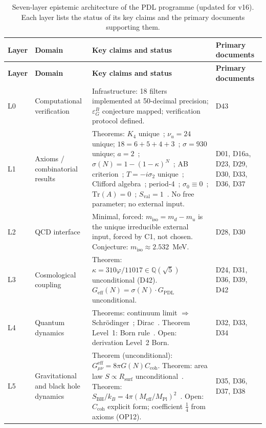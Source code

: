 \documentclass[11pt,a4paper]{article}
\theoremstyle{plain}
\theoremstyle{definition}
\theoremstyle{remark}
\newcommand{\Geff}{G_{\mathrm{eff}}}
\newcommand{\GPDL}{G_{\mathrm{PDL}}}
\newcommand{\Rsurf}{R_{\mathrm{surf}}}
\newcommand{\sigmaN}{\sigma(N)}
\newcommand{\SBH}{S_{\mathrm{BH}}}
\newcommand{\Meff}{M_{\mathrm{eff}}}
\newcommand{\MPl}{M_{\mathrm{Pl}}}
\newcommand{\epsGeomB}{\varepsilon_G^B}
\begin{document}
\begin{longtable}{L{0.6cm}L{3.0cm}L{5.5cm}L{4.0cm}}
\caption{Seven-layer epistemic architecture of the PDL programme (updated for v16). Each layer lists the status of its key claims and the primary documents supporting them.}
\label{tab:epistemic}\\
\toprule
\textbf{Layer} & \textbf{Domain} & \textbf{Key claims and status} & \textbf{Primary documents}\\
\midrule
\endfirsthead
\toprule
\textbf{Layer} & \textbf{Domain} & \textbf{Key claims and status} & \textbf{Primary documents}\\
\midrule
\endhead
\bottomrule
\endfoot
L0 & Computational verification & \textcolor{proofblue}{Infrastructure}: 18 filters implemented at 50-decimal precision; $\epsGeomB$ conjecture mapped; verification protocol defined. & D43\\[0.4em]
L1 & Axioms / combinatorial results & \textcolor{proofblue}{Theorems}: $K_4$ unique~\cite{D16a}; $\nu_u=24$ unique; $18=6+5+4+3$~\cite{D23}; $\sigma=930$ unique; $a=2$~\cite{D30}; $\sigmaN=1-(1-\kappa)^N$~\cite{D24}; AB criterion~\cite{D29}; $T=-i\sigma_2$ unique~\cite{D33}; Clifford algebra~\cite{D33}; period-4~\cite{D33}; $\sigma_0\equiv 0$~\cite{D36}; $\mathrm{Tr}(A)=0$~\cite{D36}; $S_{\mathrm{val}}=1$~\cite{D37}. No free parameter; no external input. & D01, D16a, D23, D29, D30, D33, D36, D37\\[0.4em]
L2 & QCD interface & Minimal, forced: $m_{\mathrm{iso}}=m_d-m_u$ is the unique irreducible external input, forced by C1, not chosen. \textcolor{conjecturegreen}{Conjecture}: $m_{\mathrm{iso}}\approx 2.532$~MeV. & D28, D30\\[0.4em]
L3 & Cosmological coupling & \textcolor{proofblue}{Theorem}: $\kappa=310\varphi/11017\in\mathbb{Q}(\sqrt{5})$ unconditional (D42). $\Geff(N)=\sigmaN\cdot\GPDL$ unconditional. & D24, D31, D36, D39, D42\\[0.4em]
L4 & Quantum dynamics & \textcolor{proofblue}{Theorems}: continuum limit $\Rightarrow$ Schr\"odinger~\cite{D32}; Dirac~\cite{D33}. \textcolor{proofblue}{Theorem} Level~1: Born rule~\cite{D34}. \textcolor{openproblemred}{Open}: derivation Level~2 Born. & D32, D33, D34\\[0.4em]
L5 & Gravitational and black hole dynamics & \textcolor{proofblue}{Theorem} (unconditional): $G_{\mu\nu}^{\mathrm{eff}}=8\pi G(N)C_{\mathrm{coh}}$. \textcolor{proofblue}{Theorem}: area law $S\propto\Rsurf$ unconditional~\cite{D37}. \textcolor{proofblue}{Theorem}: $\SBH/k_B=4\pi(\Meff/\MPl)^2$~\cite{D38}. \textcolor{openproblemred}{Open}: $C_{\mathrm{coh}}$ explicit form; coefficient $\tfrac{1}{4}$ from axioms (OP12). & D35, D36, D37, D38\\[0.4em]

\end{longtable}
\end{document}
